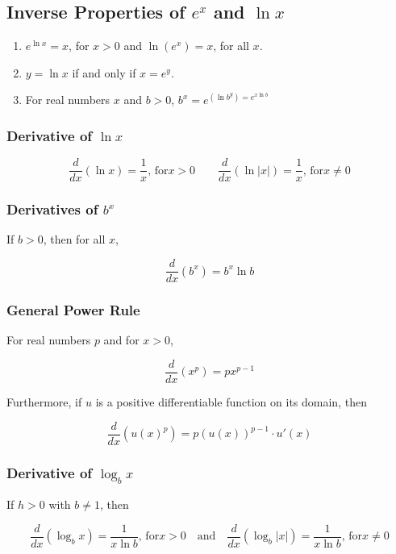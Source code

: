 %
%
%

\subsection{Inverse Properties of $e^x$ and $\ln x$}
\begin{enumerate}
    \item $e^{\ln x} = x$, for $x > 0$ and $\ln (e^x) = x$, for all $x$.
    \item $y = \ln x$ if and only if $x = e^y$.
    \item For real numbers $x$ and $b > 0$, $b^x = e^{(\ln b^y) = e^{x \ln b}}$
\end{enumerate}

\subsubsection{Derivative of $\ln x$}
\begin{equation}
    \frac{d}{dx}(\ln x) = \frac{1}{x}\text{, for} x > 0 \qquad \frac{d}{dx}( \ln |x| ) = \frac{1}{x}\text{, for} x \neq 0
\end{equation}

\subsubsection{Derivatives of $b^x$}
If $b > 0$, then for all $x$,

\begin{equation}
    \frac{d}{dx} \left( b^x \right) = b^x \ln b
\end{equation}

\subsubsection{General Power Rule}
For real numbers $p$ and for $x > 0$,

\begin{equation}
    \frac{d}{dx} \left( x^p \right) = px^{p - 1}    
\end{equation}

Furthermore, if $u$ is a positive differentiable function on its domain, then

\begin{equation}
    \frac{d}{dx} \left( {u(x)}^p \right) = {p\left( u(x) \right)}^{p - 1} \cdot u'(x)
\end{equation}

\subsubsection{Derivative of $\log_b x$}
If $h > 0$ with $b \neq 1$, then

\begin{equation}
    \frac{d}{dx} \left( \log_b x \right) = \frac{1}{x \ln b}\text{, for} x > 0 \quad\text{and}\quad \frac{d}{dx} \left( \log_b |x| \right) = \frac{1}{x \ln b}\text{, for} x \neq 0
\end{equation}

